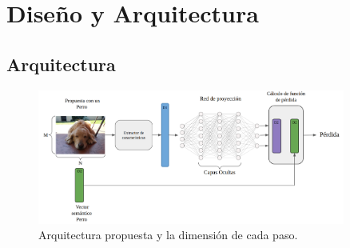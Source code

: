 \chapter{Diseño y Arquitectura}\label{cap:arquitectura}

\section{Arquitectura}
\begin{figure}
	\centering
	\includegraphics[width=0.9\textwidth]{img/arquitectura.png}
	\caption{Arquitectura propuesta y la dimensión de cada paso.}
	\label{fig:arqutectura}
\end{figure}


